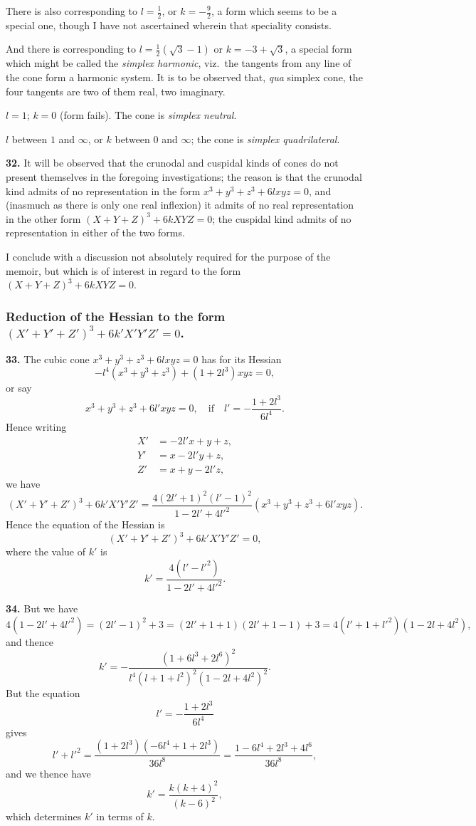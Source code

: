 \documentclass[11pt,a4paper]{article}
\theoremstyle{plain}
\begin{document}
There is also corresponding to $l = \tfrac{1}{2}$, or $k = -\tfrac{9}{2}$, a form which seems to be a special one, though I have not ascertained wherein that speciality consists.

And there is corresponding to $l = \tfrac{1}{2}(\sqrt{3}-1)$ or $k = -3+\sqrt{3}$, a special form which might be called the \textit{simplex harmonic}, viz.\ the tangents from any line of the cone form a harmonic system. It is to be observed that, \textit{qua} simplex cone, the four tangents are two of them real, two imaginary.

$l = 1$; $k = 0$ (form fails). The cone is \textit{simplex neutral}.

$l$ between $1$ and $\infty$, or $k$ between $0$ and $\infty$; the cone is \textit{simplex quadrilateral}.

\noindent\textbf{32.} It will be observed that the crunodal and cuspidal kinds of cones do not present themselves in the foregoing investigations; the reason is that the crunodal kind admits of no representation in the form $x^3+y^3+z^3+6lxyz=0$, and (inasmuch as there is only one real inflexion) it admits of no real representation in the other form $(X+Y+Z)^3 + 6kXYZ = 0$; the cuspidal kind admits of no representation in either of the two forms.

I conclude with a discussion not absolutely required for the purpose of the memoir, but which is of interest in regard to the form $(X+Y+Z)^3 + 6kXYZ = 0$.

\subsubsection*{Reduction of the Hessian to the form $(X'+Y'+Z')^3 + 6k'X'Y'Z' = 0$.}

\noindent\textbf{33.} The cubic cone $x^3+y^3+z^3+6lxyz=0$ has for its Hessian
\[
-l^4(x^3+y^3+z^3) + (1+2l^3)xyz = 0,
\]
or say
\[
x^3+y^3+z^3+6l'xyz=0, \quad \text{if} \quad l' = -\frac{1+2l^3}{6l^4}.
\]
Hence writing
\begin{align*}
X' &= -2l'x + y + z,\\
Y' &= x - 2l'y + z,\\
Z' &= x + y - 2l'z,
\end{align*}
we have
\[
(X'+Y'+Z')^3 + 6k'X'Y'Z' = \frac{4(2l'+1)^2(l'-1)^2}{1-2l'+4l'^2}(x^3+y^3+z^3+6l'xyz).
\]
Hence the equation of the Hessian is
\[
(X'+Y'+Z')^3 + 6k'X'Y'Z' = 0,
\]
where the value of $k'$ is
\[
k' = \frac{4(l'-l'^2)}{1-2l'+4l'^2}.
\]

\noindent\textbf{34.} But we have
\[
4(1-2l'+4l'^2) = (2l'-1)^2 + 3 = (2l'+1+1)(2l'+1-1) + 3 = 4(l'+1+l'^2)(1-2l+4l^2),
\]
and thence
\[
k' = -\frac{(1+6l^3+2l^6)^2}{l^4(l+1+l^2)^2(1-2l+4l^2)^2}.
\]
But the equation
\[
l' = -\frac{1+2l^3}{6l^4}
\]
gives
\[
l' + l'^2 = \frac{(1+2l^3)(-6l^4+1+2l^3)}{36l^8} = \frac{1-6l^4+2l^3+4l^6}{36l^8},
\]
and we thence have
\[
k' = \frac{k(k+4)^2}{(k-6)^2},
\]
which determines $k'$ in terms of $k$.
\end{document}
